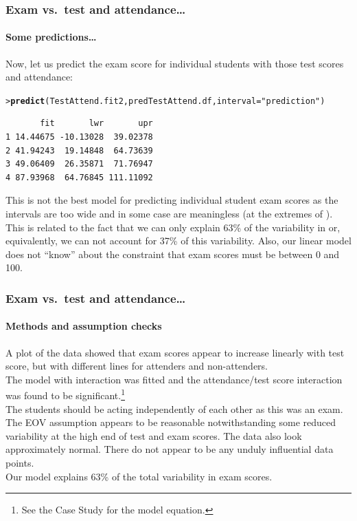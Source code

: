 \documentclass{beamer}\usepackage[]{graphicx}\usepackage[]{xcolor}
\makeatletter
\newcommand{\hlstr}[1]{\textcolor[rgb]{0.192,0.494,0.8}{#1}}%
\newcommand{\hlstd}[1]{\textcolor[rgb]{0.345,0.345,0.345}{#1}}%
\newcommand{\hlkwc}[1]{\textcolor[rgb]{0.333,0.667,0.333}{#1}}%
\newcommand{\hlkwd}[1]{\textcolor[rgb]{0.737,0.353,0.396}{\textbf{#1}}}%
\newenvironment{kframe}{%
 \def\at@end@of@kframe{}%
 \ifinner\ifhmode%
  \def\at@end@of@kframe{\end{minipage}}%
  \begin{minipage}{\columnwidth}%
 \fi\fi%
 \def\FrameCommand##1{\hskip\@totalleftmargin \hskip-\fboxsep
 \colorbox{shadecolor}{##1}\hskip-\fboxsep
     \hskip-\linewidth \hskip-\@totalleftmargin \hskip\columnwidth}%
 \MakeFramed {\advance\hsize-\width
   \@totalleftmargin\z@ \linewidth\hsize
   \@setminipage}}%
 {\par\unskip\endMakeFramed%
 \at@end@of@kframe}
\newenvironment{knitrout}{}{} %
\makeatother
\begin{document}
\begin{frame}[fragile]
\frametitle{Exam vs.\ test \textbf{and} attendance\ldots}
\framesubtitle{Some predictions\ldots}
Now, let us predict the exam score for individual students with those test scores
and attendance:\\
\medskip
\begin{knitrout}\scriptsize
{}\color{fgcolor}\begin{kframe}
\begin{alltt}
\hlstd{> }\hlkwd{predict}\hlstd{(TestAttend.fit2,predTestAttend.df,} \hlkwc{interval}\hlstd{=}\hlstr{"prediction"}\hlstd{)}
\end{alltt}
\begin{verbatim}
       fit       lwr       upr
1 14.44675 -10.13028  39.02378
2 41.94243  19.14848  64.73639
3 49.06409  26.35871  71.76947
4 87.93968  64.76845 111.11092
\end{verbatim}
\end{kframe}
\end{knitrout}
\medskip
This is not the best model for predicting individual student exam scores as the intervals are too wide and in some case are meaningless (at the extremes of ). \\
\medskip
This is related to the fact that we can only explain 63\% of the variability in  or, equivalently, we can not account for 37\% of this variability. Also, our linear model does not ``know'' about the constraint that exam scores must be between 0 and 100.
\end{frame}


\begin{frame}[fragile]
\frametitle{Exam vs.\ test \textbf{and} attendance\ldots}
\framesubtitle{Methods and assumption checks}

A plot of the data showed that exam scores appear to increase linearly with test score,
but with different lines for attenders and non-attenders.\\
\bigskip
The model with interaction was fitted and the attendance/test score interaction was found to be significant.\footnote{See the Case Study for the model equation.}\\
\bigskip
The students should be acting independently of each other as this was an exam.\\
\bigskip
The EOV assumption appears to be reasonable notwithstanding some reduced variability at the high end of test and exam scores.
The data also look approximately normal.
There do not appear to be any unduly influential data points. \\
\bigskip 
Our model explains 63\% of the total variability in exam scores.
\end{frame}
\end{document}
